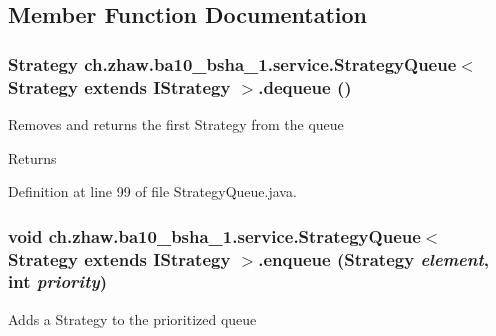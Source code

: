 \subsection{Member Function Documentation}
\hypertarget{classch_1_1zhaw_1_1ba10__bsha__1_1_1service_1_1StrategyQueue_3_01Strategy_01extends_01IStrategy_01_4_a7babaf26a238bf7906fef212a5ea2ae0}{
\subsubsection[{dequeue}]{\setlength{\rightskip}{0pt plus 5cm}Strategy ch.zhaw.ba10\_\-bsha\_\-1.service.StrategyQueue$<$ Strategy extends {\bf IStrategy} $>$.dequeue ()}}
\label{classch_1_1zhaw_1_1ba10__bsha__1_1_1service_1_1StrategyQueue_3_01Strategy_01extends_01IStrategy_01_4_a7babaf26a238bf7906fef212a5ea2ae0}
Removes and returns the first Strategy from the queue

\begin{DoxyReturn}{Returns}

\end{DoxyReturn}


Definition at line 99 of file StrategyQueue.java.\hypertarget{classch_1_1zhaw_1_1ba10__bsha__1_1_1service_1_1StrategyQueue_3_01Strategy_01extends_01IStrategy_01_4_a599a285ab1a1c49c6a664987897301ec}{
\subsubsection[{enqueue}]{\setlength{\rightskip}{0pt plus 5cm}void ch.zhaw.ba10\_\-bsha\_\-1.service.StrategyQueue$<$ Strategy extends {\bf IStrategy} $>$.enqueue (Strategy {\em element}, \/  int {\em priority})}}
\label{classch_1_1zhaw_1_1ba10__bsha__1_1_1service_1_1StrategyQueue_3_01Strategy_01extends_01IStrategy_01_4_a599a285ab1a1c49c6a664987897301ec}
Adds a Strategy to the prioritized queue


